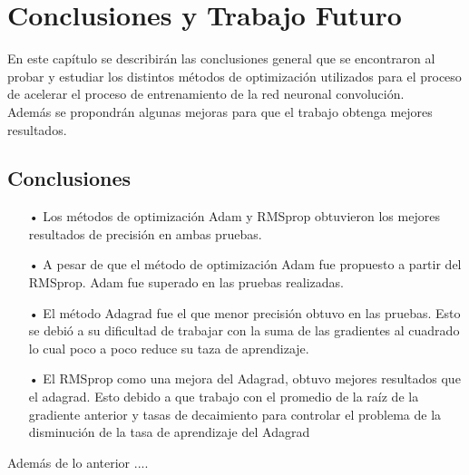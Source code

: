 \chapter{Conclusiones y Trabajo Futuro}
En este capítulo se describirán las conclusiones general que se encontraron al probar y estudiar los distintos métodos de optimización utilizados para el proceso de acelerar el proceso de entrenamiento de la red neuronal convolución.\\ Además se propondrán algunas mejoras para que el trabajo obtenga mejores resultados.


\section{Conclusiones}


\begin{itemize}

\item[•] Los métodos de optimización Adam y RMSprop obtuvieron los mejores resultados de precisión en ambas pruebas.
\item[•] A pesar de que el método de optimización Adam fue propuesto a partir del RMSprop. Adam fue superado en las pruebas realizadas.
\item[•] El método Adagrad fue el que menor precisión obtuvo en las pruebas. Esto se debió a su dificultad de trabajar con la suma de las gradientes al cuadrado lo cual poco a poco reduce su taza de aprendizaje.
\item[•] El RMSprop como una mejora del Adagrad, obtuvo mejores resultados que el adagrad. Esto debido a que trabajo con el promedio de la raíz de la gradiente anterior y tasas de decaimiento para controlar el problema de la disminución de la tasa de aprendizaje del Adagrad

\end{itemize}
Además de lo anterior ....

